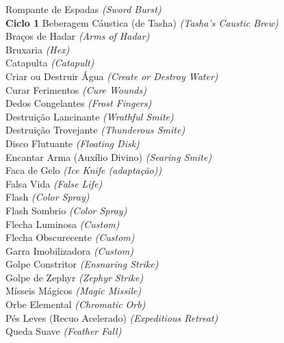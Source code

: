 \documentclass{RPG_Adventure}[2021/10/20]
\begin{document}
{\normalsize Rompante de Espadas \textit{(Sword Burst)}\\ }
\jump\noindent\textbf{Ciclo 1}
{\normalsize Beberagem Cáustica (de Tasha) \textit{(Tasha's Caustic Brew)}\\ }
{\normalsize Braços de Hadar \textit{(Arms of Hadar)}\\ }
{\normalsize Bruxaria \textit{(Hex)}\\ }
{\normalsize Catapulta \textit{(Catapult)}\\ }
{\normalsize Criar ou Destruir Água \textit{(Create or Destroy Water)}\\ }
{\normalsize Curar Ferimentos \textit{(Cure Wounds)}\\ }
{\normalsize Dedos Congelantes \textit{(Frost Fingers)}\\ }
{\normalsize Destruição Lancinante \textit{(Wrathful Smite)}\\ }
{\normalsize Destruição Trovejante \textit{(Thunderous Smite)}\\ }
{\normalsize Disco Flutuante \textit{(Floating Disk)}\\ }
{\normalsize Encantar Arma (Auxílio Divino) \textit{(Searing Smite)}\\ }
{\normalsize Faca de Gelo \textit{(Ice Knife (adaptação))}\\ }
{\normalsize Falsa Vida \textit{(False Life)}\\ }
{\normalsize Flash \textit{(Color Spray)}\\ }
{\normalsize Flash Sombrio \textit{(Color Spray)}\\ }
{\normalsize Flecha Luminosa \textit{(Custom)}\\ }
{\normalsize Flecha Obscurecente \textit{(Custom)}\\ }
{\normalsize Garra Imobilizadora \textit{(Custom)}\\ }
{\normalsize Golpe Constritor \textit{(Ensnaring Strike)}\\ }
{\normalsize Golpe de Zephyr \textit{(Zephyr Strike)}\\ }
{\normalsize Mísseis Mágicos \textit{(Magic Missile)}\\ }
{\normalsize Orbe Elemental \textit{(Chromatic Orb)}\\ }
{\normalsize Pés Leves (Recuo Acelerado) \textit{(Expeditious Retreat)}\\ }
{\normalsize Queda Suave \textit{(Feather Fall)}\\ }
\end{document}
